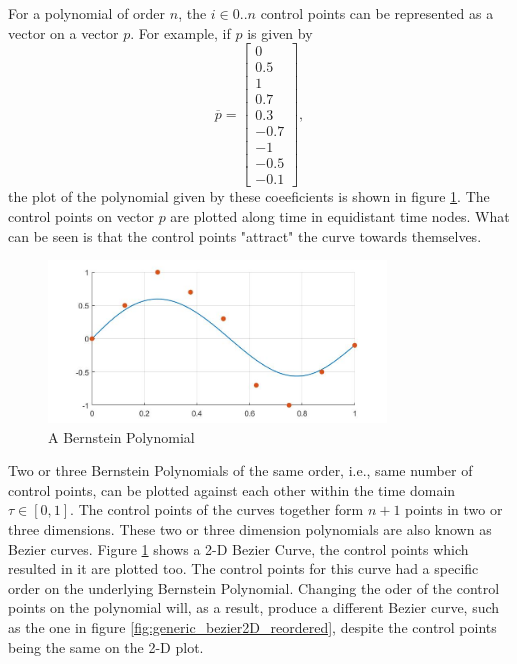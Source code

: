 \par For a polynomial of order $n$, the $i \in {0 .. n}$ control points can be represented as a vector on a vector $p$. For example, if $p$ is given by 
\begin{equation}
    \overline{p} = \begin{bmatrix}0\\ 0.5\\ 1\\ 0.7\\ 0.3\\ -0.7\\ -1\\ -0.5\\ -0.1\end{bmatrix},
\end{equation}
the plot of the polynomial given by these coeeficients is shown in figure \ref{fig:generic_bezier}. The control points on vector $p$ are plotted along time in equidistant time nodes. What can be seen is that the control points "attract" the curve towards themselves.

\begin{figure}[h!]
\centering
\includegraphics[width=0.8\textwidth]{Images/generic_bezier.jpg}
\caption{A Bernstein Polynomial}
\label{fig:generic_bezier}
\end{figure}


\par Two or three Bernstein Polynomials of the same order, i.e., same number of control points, can be plotted against each other within the time domain $\tau \in [0,1]$. The control points of the curves together form $n+1$ points in two or three dimensions. These two or three dimension polynomials are also known as Bezier curves. Figure \ref{fig:generic_bezier} shows a 2-D Bezier Curve, the control points which resulted in it are plotted too. The control points for this curve had a specific order on the underlying Bernstein Polynomial. Changing the oder of the control points on the polynomial will, as a result, produce a different Bezier curve, such as the one in figure \ref{fig:generic_bezier2D_reordered}, despite the control points being the same on the 2-D plot.

